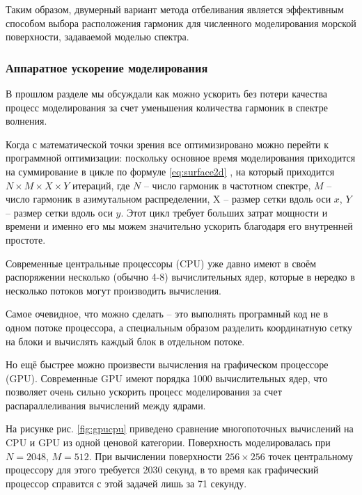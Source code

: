 Таким образом, двумерный вариант метода отбеливания является эффективным
способом выбора расположения гармоник для численного моделирования морской
поверхности, задаваемой моделью спектра.


\subsubsection{Аппаратное ускорение моделирования}%
\label{ssub:apparatnoe_uskorenie_modelirovaniia}


В прошлом разделе мы обсуждали как можно ускорить без потери качества процесс моделирования за счет уменьшения количества гармоник в спектре волнения.

Когда с математической точки зрения все оптимизировано можно перейти к
программной оптимизации: поскольку основное время моделирования приходится на
суммирование в цикле по формуле \eqref{eq:surface2d} , на который приходится
$N\times M \times X \times Y$ итераций, где $N$ – число гармоник в частотном
спектре, $M$ – число гармоник в азимутальном распределении, X – размер сетки
вдоль оси $x$, $Y$ – размер сетки вдоль оси $y$. Этот цикл требует больших
затрат мощности и времени и именно его мы можем значительно ускорить благодаря
его внутренней простоте.

Современные центральные процессоры (CPU) уже давно имеют в своём распоряжении
несколько (обычно 4-8) вычислительных ядер, которые в нередко в несколько
потоков могут производить вычисления.

Самое очевидное, что можно сделать – это выполнять програмный код не в одном потоке процессора, а специальным образом разделить координатную сетку на блоки и вычислять каждый блок в отдельном потоке.

Но ещё быстрее можно произвести вычисления на графическом процессоре (GPU).
Современные GPU имеют порядка 1000 вычислительных ядер, что позволяет очень
сильно ускорить процесс моделирования за счет распараллеливания вычислений
между ядрами.

На рисунке рис. \ref{fig:gpucpu} приведено сравнение многопоточных вычислений на CPU и GPU из
одной ценовой категории. Поверхность моделировалась при $N=2048$, $M=512$. При
вычислении поверхности $256\times256$ точек центральному процессору для этого
требуется 2030 секунд, в то время как графический процессор справится с этой
задачей лишь за 71 секунду.

